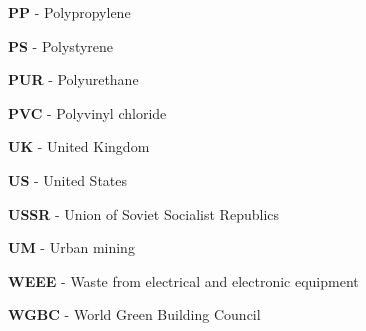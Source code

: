 \begin{scriptsize}
\begin{myitemize}
  \item[] \textbf{PP} - Polypropylene
  \item[] \textbf{PS} - Polystyrene
  \item[] \textbf{PUR} - Polyurethane
  \item[] \textbf{PVC} - Polyvinyl chloride
  \item[] \textbf{UK} - United Kingdom
  \item[] \textbf{US} - United States
  \item[] \textbf{USSR} - Union of Soviet Socialist Republics
  \item[] \textbf{UM} - Urban mining
  \item[] \textbf{WEEE} - Waste from electrical and electronic equipment
  \item[] \textbf{WGBC} - World Green Building Council
  \end{myitemize}
\end{scriptsize}

